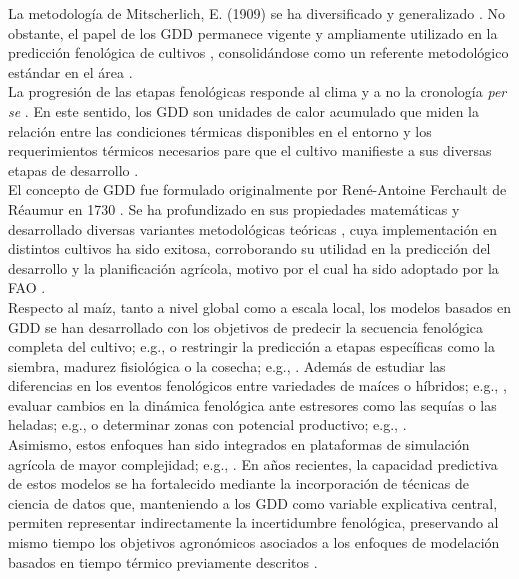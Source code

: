 La metodología de Mitscherlich, E. (1909) \cite{Mitscherlich_1909} se ha diversificado y generalizado \cite{Koya_2013}. No obstante, el papel de los GDD permanece vigente y ampliamente utilizado en la predicción fenológica de cultivos \cite{Ahmed_2026,KUBOTA_2016,PAREDES_2025, Poggi_2026,Rafique_2024, WINKLER_2013}, consolidándose como un referente metodológico estándar en el área \cite{AMARE_2023}.\\

La progresión de las etapas fenológicas responde al clima y a no la cronología \textit{per se} \cite{Perala_1985}. En este sentido, los GDD son unidades de calor acumulado que miden la relación entre las condiciones térmicas disponibles en el entorno y los requerimientos térmicos necesarios pare que el cultivo manifieste a sus diversas etapas de desarrollo \cite{Anandhi_2016}.\\



El concepto de GDD fue formulado originalmente por René-Antoine Ferchault de Réaumur en 1730 \cite{ Anandhi_2016, Giolo_2021}. Se ha profundizado en sus propiedades matemáticas \cite{MCMASTER_1997, YANG_1995} y desarrollado diversas variantes metodológicas teóricas \cite{ Elnesr_2013, Zhou_2018}, cuya implementación en distintos cultivos ha sido exitosa, corroborando su utilidad en la predicción del desarrollo y la planificación agrícola, motivo por el cual ha sido adoptado por la FAO \cite{PAREDES_2025}.\\


Respecto al maíz, tanto a nivel global como a escala local, los modelos basados en GDD se han desarrollado con los objetivos de predecir la secuencia fenológica completa del cultivo; e.g., \cite{NARWAL_1986,Ghamghami_2018} o restringir la predicción a etapas específicas como la siembra, madurez fisiológica o la cosecha; e.g., \cite{Parker_2016,Iizumi_2019, Waha_2011, Pinto_2024}. Además de estudiar las diferencias en los eventos fenológicos entre  variedades de maíces o híbridos; e.g., \cite{Baum_2019,Mason_2018,Anandhi_2016}, evaluar cambios en la dinámica fenológica ante estresores como las sequías o las heladas; e.g., \cite{Kim_2024,Kukal_2018, Zhou_2024} o determinar zonas con potencial productivo; e.g., \cite{Butler_2015, Li_2025_ML,vanBussel_2015}.\\

Asimismo, estos enfoques han sido integrados en plataformas de simulación agrícola de mayor complejidad; e.g., \cite{Angel_2017, Yang_2004}. En años recientes, la capacidad predictiva de estos modelos se ha fortalecido mediante la incorporación de técnicas de ciencia de datos que, manteniendo a los GDD como variable explicativa central, permiten representar indirectamente la incertidumbre fenológica, preservando al mismo tiempo los objetivos agronómicos asociados a los enfoques de modelación basados en tiempo térmico previamente descritos \cite{Ji_2026}.\\


